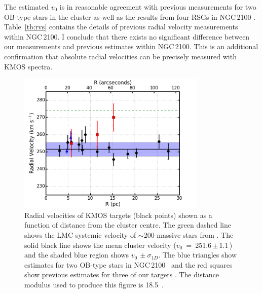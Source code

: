 The estimated $v_0$ is in reasonable agreement with previous measurements for two OB-type stars in the cluster
\citep{2015A&A...584A...5E} as well as the results from four RSGs in NGC\,2100
\citep[henceforth JT94; three of which were observed in the current study]{1994A&A...282..717J}.
Table~\ref{tb:rvs} contains the details of previous radial velocity measurements within NGC\,2100.
I conclude that there exists no significant difference between our measurements and previous estimates within NGC\,2100.
This is an additional confirmation that absolute radial velocities can be precisely measured with KMOS spectra.

\begin{figure}
 \centering
 \includegraphics[width=9.0cm]{ngc2100/NGC2100-rv-v10}
 \caption{Radial velocities of KMOS targets (black points) shown as a function of distance from the cluster centre.
The green dashed line shows the LMC systemic velocity of $\sim$200 massive stars from
 {\protect\citep[274.1\,$\pm$\,16.4\,\kms;][]{2015A&A...584A...5E}}.
 The solid black line shows the mean cluster velocity ($v_0$~=~251.6\,$\pm$\,1.1\,\kms) and the shaded blue region shows $v_0\,\pm\sigma_{1D}$.
 The blue triangles show estimates for two OB-type stars in NGC\,2100~\protect\citep{2015A&A...584A...5E} and the red squares show previous estimates for three of our targets
 {\citep{1994A&A...282..717J}}.
 The distance modulus used to produce this figure is 18.5~\citep{2013Natur.495...76P,2014AJ....147..122D}.
 \label{fig:rvs}}
\end{figure}


